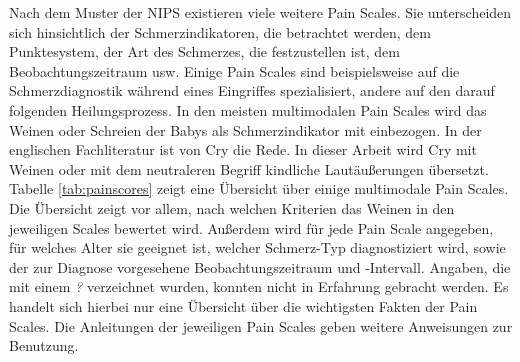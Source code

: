 Nach dem Muster der NIPS existieren viele weitere Pain Scales. Sie unterscheiden sich hinsichtlich der Schmerzindikatoren, die betrachtet werden, dem Punktesystem, der Art des Schmerzes, die festzustellen ist, dem Beobachtungszeitraum usw. Einige Pain Scales sind beispielsweise auf die Schmerzdiagnostik während eines Eingriffes spezialisiert, andere auf den darauf folgenden Heilungsprozess. In den meisten multimodalen Pain Scales wird das Weinen oder Schreien der Babys als Schmerzindikator mit einbezogen. In der englischen Fachliteratur ist von \glqq Cry\grqq{} die Rede.\cite[S. 97 - 98]{painInNeonates} In dieser Arbeit wird \glqq Cry\grqq{} mit \glqq Weinen\grqq{} oder mit dem neutraleren Begriff \glqq kindliche Lautäußerungen\grqq{} übersetzt. Tabelle \ref{tab:painscores} zeigt eine Übersicht über einige multimodale Pain Scales. Die Übersicht zeigt vor allem, nach welchen Kriterien das Weinen in den jeweiligen Scales bewertet wird. Außerdem wird für jede Pain Scale angegeben, für welches Alter sie geeignet ist, welcher Schmerz-Typ diagnostiziert wird, sowie der zur Diagnose vorgesehene Beobachtungszeitraum und -Intervall. Angaben, die mit einem \emph{?} verzeichnet wurden, konnten nicht in Erfahrung gebracht werden. Es handelt sich hierbei nur eine Übersicht über die wichtigsten Fakten der Pain Scales. Die Anleitungen der jeweiligen Pain Scales geben weitere Anweisungen zur Benutzung.

